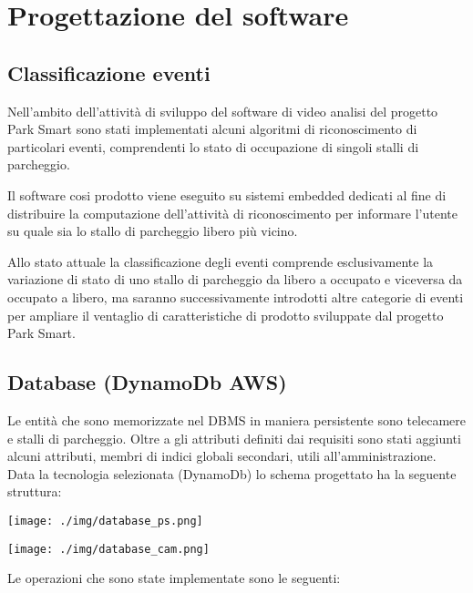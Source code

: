 \chapter{Progettazione del software}


\section{Classificazione eventi}
Nell'ambito dell'attività di sviluppo del software di video analisi del progetto Park Smart sono stati implementati alcuni algoritmi di riconoscimento di particolari eventi, comprendenti lo stato di occupazione di singoli stalli di parcheggio. 

Il software cosi prodotto viene eseguito su sistemi embedded dedicati al fine di distribuire la computazione dell'attività di riconoscimento per informare l'utente su quale sia lo stallo di parcheggio libero più vicino. 

Allo stato attuale la classificazione degli eventi comprende esclusivamente la variazione di stato di uno stallo di parcheggio da libero a occupato e viceversa da occupato a libero, ma saranno successivamente introdotti altre categorie di eventi per ampliare il ventaglio di caratteristiche di prodotto sviluppate dal progetto Park Smart.
\vspace{7.5truecm}

\section{Database (DynamoDb AWS)}
Le entità che sono memorizzate nel DBMS in maniera persistente sono telecamere e stalli di parcheggio. Oltre a gli attributi definiti dai requisiti sono stati aggiunti alcuni attributi, membri di indici globali secondari, utili all'amministrazione. Data la tecnologia selezionata (DynamoDb) lo schema progettato ha la seguente struttura:

\vspace{1.2truecm}

\centerline{\texttt{[image: ./img/database\_ps.png]}}

\vspace{1.6truecm}

\centerline{\texttt{[image: ./img/database\_cam.png]}}

\vspace{1.2truecm}

Le operazioni che sono state implementate sono le seguenti:


